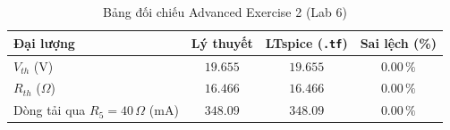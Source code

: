 \documentclass[11pt,a4paper]{article}
\newcommand{\cmd}[1]{\texttt{#1}}
\begin{document}
\begin{table}[H]\centering\small
\caption{Bảng đối chiếu Advanced Exercise 2 (Lab 6)}
\begin{tabular}{|l|c|c|c|}
\hline
\textbf{Đại lượng} & \textbf{Lý thuyết} & \textbf{LTspice (\cmd{.tf})} & \textbf{Sai lệch (\%)} \\ \hline
$V_{th}$ (V) & $19.655$ & $19.655$ & $0.00\,\%$ \\ \hline
$R_{th}$ ($\Omega$) & $16.466$ & $16.466$ & $0.00\,\%$ \\ \hline
Dòng tải qua $R_5=40\,\Omega$ (mA) & $348.09$ & $348.09$ & $0.00\,\%$ \\ \hline
\end{tabular}
\end{table}
\end{document}
